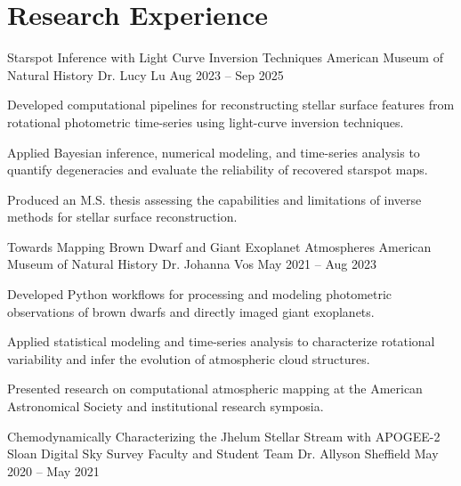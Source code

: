 \section{Research Experience}

\researchentry
  {Starspot Inference with Light Curve Inversion Techniques}
  {American Museum of Natural History}
  {Dr. Lucy Lu}
  {Aug 2023 -- Sep 2025}

\begin{researchitems}
  \item Developed computational pipelines for reconstructing stellar surface features from rotational photometric time-series using light-curve inversion techniques.

  \item Applied Bayesian inference, numerical modeling, and time-series analysis to quantify degeneracies and evaluate the reliability of recovered starspot maps.

  \item Produced an M.S. thesis assessing the capabilities and limitations of inverse methods for stellar surface reconstruction.
\end{researchitems}

\vspace{0.4em}

\researchentry
  {Towards Mapping Brown Dwarf and Giant Exoplanet Atmospheres}
  {American Museum of Natural History}
  {Dr. Johanna Vos}
  {May 2021 -- Aug 2023}

\begin{researchitems}
  \item Developed Python workflows for processing and modeling photometric observations of brown dwarfs and directly imaged giant exoplanets.

  \item Applied statistical modeling and time-series analysis to characterize rotational variability and infer the evolution of atmospheric cloud structures.

  \item Presented research on computational atmospheric mapping at the American Astronomical Society and institutional research symposia.
\end{researchitems}

\vspace{0.4em}

\researchentry
  {Chemodynamically Characterizing the Jhelum Stellar Stream with APOGEE-2}
  {Sloan Digital Sky Survey Faculty and Student Team}
  {Dr. Allyson Sheffield}
  {May 2020 -- May 2021}

